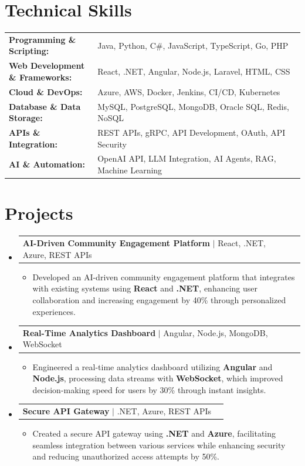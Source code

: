\documentclass[letterpaper,10pt]{article}
\makeatletter
\newcommand{\resumeItem}[1]{
  \item{\fontsize{8pt}{9pt}\selectfont
    #1 \vspace{-3pt}
  }
}
\newcommand{\resumeProjectHeading}[2]{
    \item
    \begin{tabular*}{1.001\textwidth}{l@{\extracolsep{\fill}}r}
      \fontsize{8.5pt}{10pt}#1 & \textbf{\fontsize{8.5pt}{10pt} #2}\\
    \end{tabular*}\vspace{-7pt}
}
\newcommand{\resumeSubHeadingListStart}{\begin{itemize}[leftmargin=0pt, label={}]}
\newcommand{\resumeSubHeadingListEnd}{\end{itemize}}
\newcommand{\resumeItemListStart}{\begin{itemize}[leftmargin=*]}
\newcommand{\resumeItemListEnd}{\end{itemize}\vspace{-5pt}}
\makeatother
\begin{document}
\section{Technical Skills}
        \vspace{-14pt}
        \begin{table}[h]
            \fontsize{8pt}{9pt}\selectfont
            \begin{tabular}{p{0.3\linewidth} p{0.7\linewidth}}
                \textbf{Programming \& Scripting:} & Java, Python, C\#, JavaScript, TypeScript, Go, PHP \\
                \textbf{Web Development \& Frameworks:} & React, .NET, Angular, Node.js, Laravel, HTML, CSS \\
                \textbf{Cloud \& DevOps:} & Azure, AWS, Docker, Jenkins, CI/CD, Kubernetes \\
                \textbf{Database \& Data Storage:} & MySQL, PostgreSQL, MongoDB, Oracle SQL, Redis, NoSQL \\
                \textbf{APIs \& Integration:} & REST APIs, gRPC, API Development, OAuth, API Security \\
                \textbf{AI \& Automation:} & OpenAI API, LLM Integration, AI Agents, RAG, Machine Learning \\
            \end{tabular}
        \end{table}
 \vspace{-18pt}

\section{Projects}
    \vspace{-5pt}
    \resumeSubHeadingListStart
          \resumeProjectHeading
            {\textbf{AI-Driven Community Engagement Platform} $|$ React, .NET, Azure, REST APIs}{}
            \resumeItemListStart
                \resumeItem{Developed an AI-driven community engagement platform that integrates with existing systems using \textbf{React} and \textbf{.NET}, enhancing user collaboration and increasing engagement by 40\% through personalized experiences.}
            \resumeItemListEnd
        \vspace{-12pt}
    
        \resumeProjectHeading
            {\textbf{Real-Time Analytics Dashboard} $|$ Angular, Node.js, MongoDB, WebSocket}{}
        \resumeItemListStart
                \resumeItem{Engineered a real-time analytics dashboard utilizing \textbf{Angular} and \textbf{Node.js}, processing data streams with \textbf{WebSocket}, which improved decision-making speed for users by 30\% through instant insights.}
        \resumeItemListEnd
      \vspace{-12pt}
      \resumeProjectHeading
        {\textbf{Secure API Gateway} $|$ .NET, Azure, REST APIs}{}
    \resumeItemListStart
            \resumeItem{Created a secure API gateway using \textbf{.NET} and \textbf{Azure}, facilitating seamless integration between various services while enhancing security and reducing unauthorized access attempts by 50\%.}
    \resumeItemListEnd
    \resumeSubHeadingListEnd
\end{document}
